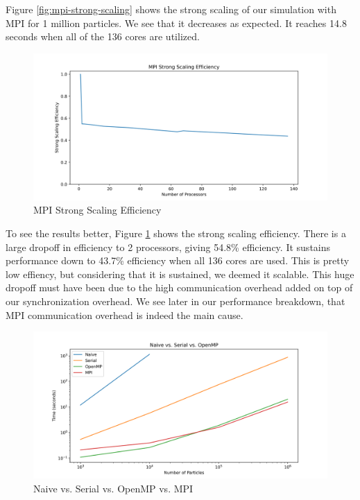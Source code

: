\documentclass{article}
\begin{document}
Figure \ref{fig:mpi-strong-scaling} shows the strong scaling of our simulation with MPI for 1 million particles. We see that it decreases as expected. It reaches 14.8 seconds when all of the 136 cores are utilized.

\begin{figure}[H]
\centering
\includegraphics[width=6in]{figures/mpi_strong_scaling_efficiency.png}
\caption{MPI Strong Scaling Efficiency}
\label{fig:mpi-strong-scaling-efficiency}
\end{figure}

To see the results better, Figure \ref{fig:mpi-strong-scaling-efficiency} shows the strong scaling efficiency. There is a large dropoff in efficiency to 2 processors, giving 54.8\% efficiency. It sustains performance down to 43.7\% efficiency when all 136 cores are used. This is pretty low effiency, but considering that it is sustained, we deemed it scalable. This huge dropoff must have been due to the high communication overhead added on top of our synchronization overhead. We see later in our performance breakdown, that MPI communication overhead is indeed the main cause. 

\begin{figure}[H]
\centering
\includegraphics[width=6in]{figures/mpi_compared.png}
\caption{Naive vs. Serial vs. OpenMP vs. MPI}
\label{fig:mpi-compared}
\end{figure}
\end{document}
